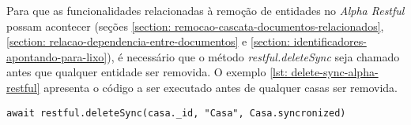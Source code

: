 Para que as funcionalidades relacionadas à remoção de entidades no \textit{Alpha Restful} possam acontecer (seções \ref{section: remocao-cascata-documentos-relacionados}, \ref{section: relacao-dependencia-entre-documentos} e \ref{section: identificadores-apontando-para-lixo}), é necessário que o método \textit{restful.deleteSync} seja chamado antes que qualquer entidade ser removida. O exemplo \ref{lst: delete-sync-alpha-restful} apresenta o código a ser executado antes de qualquer casas ser removida.

\begin{lstlisting}[style=ES6, caption={Antes de Remover Uma Casa\label{lst: delete-sync-alpha-restful}}]
  await restful.deleteSync(casa._id, "Casa", Casa.syncronized)
\end{lstlisting}